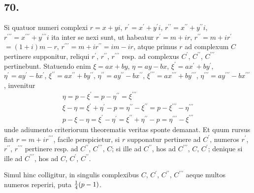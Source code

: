 \documentclass[twoside,12pt, showframe]{memoir}
\let\oldfrac\frac
\def\frac#1#2{\mathchoice{\tfrac{#1}{#2}}{\oldfrac{#1}{#2}}{\genfrac{}{}{}{2}{#1}{#2\mathstrut}}{\genfrac{}{}{}{3}{#1}{#2\mathstrut}}}
\begin{document}
\subsection*{70.}
 
Si quatuor numeri complexi \(r=x+y i\), \(r^{\prime}=x^{\prime}+y^{\prime} i\), \( r^{\prime \prime}=x^{\prime \prime}+y^{\prime \prime} i\), \(r^{\prime \prime \prime}=x^{\prime \prime \prime}+y^{\prime \prime \prime} i\) ita inter se nexi sunt, ut habeatur \(r^{\prime}=m+i r\), \( r^{\prime \prime}=m+i r^{\prime}\) \(=(1+i) m-r\), \( r^{\prime \prime \prime}=m+i r^{\prime \prime}=i m-i r\), atque primus \(r\) ad complexum \(C\) pertinere supponitur, reliqui \(r^{\prime}\), \( r^{\prime \prime}\), \( r^{\prime \prime \prime}\) resp. ad complexus \(C^{\prime}\), \( C^{\prime \prime}\), \( C^{\prime \prime \prime}\) pertinebunt. Statuendo enim \(\xi=a x+b y\), \( \eta=a y-b x\), \( \xi^{\prime}=a x^{\prime}+b y^{\prime}\), \( \eta^{\prime}=a y^{\prime}-b x^{\prime}\), \(\xi^{\prime \prime}=a x^{\prime \prime}+b y^{\prime \prime}\), \( \eta^{\prime \prime}=a y^{\prime \prime}-b x^{\prime \prime}\), \( \xi^{\prime \prime \prime}=a x^{\prime \prime \prime}+b y^{\prime \prime \prime}\), \( \eta^{\prime \prime \prime}=a y^{\prime \prime \prime}-b x^{\prime \prime \prime}\), invenitur
\[\begin{gathered}
\eta=p-\xi^{\prime}=p-\eta^{\prime \prime}=\xi^{\prime \prime \prime} \\
\xi-\eta=\xi^{\prime}+\eta^{\prime}-p=\eta^{\prime \prime}-\xi^{\prime \prime}=p-\xi^{\prime \prime \prime}-\eta^{\prime \prime \prime} \\
p-\xi-\eta=\xi^{\prime}-\eta^{\prime}=\xi^{\prime \prime}+\eta^{\prime \prime}-p=\eta^{\prime \prime \prime}-\xi^{\prime \prime \prime}
\end{gathered}\]
unde adiumento criteriorum theorematis veritas sponte demanat. Et quum rursus fiat \(r=m+i r^{\prime \prime \prime}\), facile perspicietur, si \(r\) supponatur pertinere ad \(C^{\prime}\), numeros \(r^{\prime}\), \( r^{\prime \prime}\), \( r^{\prime \prime \prime}\) pertinere resp. ad \(C^{\prime \prime}\), \( C^{\prime \prime \prime}\), \( C\); si ille ad \(C^{\prime \prime}\), hos ad \(C^{\prime \prime \prime}\), \( C\), \( C^{\prime}\); denique si ille ad \(C^{\prime \prime \prime}\), hos ad \(C\), \( C^{\prime}\), \( C^{\prime \prime}\).
 
Simul hinc colligitur, in singulis complexibus \(C\), \( C^{\prime}\), \( C^{\prime \prime}\), \( C^{\prime \prime \prime}\) aeque multos numeros reperiri, puta \(\frac{1}{4}(p-1)\).
\end{document}
